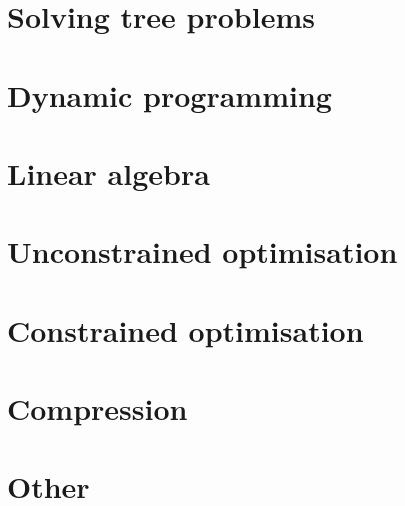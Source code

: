 \documentclass[oneside]{book}
\begin{document}
\part{Solving tree problems}







\part{Dynamic programming}




\part{Linear algebra}









\part{Unconstrained optimisation}





\part{Constrained optimisation}


\part{Compression}


\part{Other}


\end{document}
